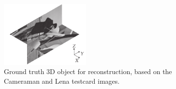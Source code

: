 \documentclass{osa-article}
\begin{document}
\begin{figure}
        \centering
        \includegraphics[width=0.4\textwidth]{./figures/ortho_3d_correct}
        \caption{Ground truth 3D object for reconstruction, based on the Cameraman and Lena testcard images.}\label{fig:ortho_3d_correct}
\end{figure}
\end{document}

